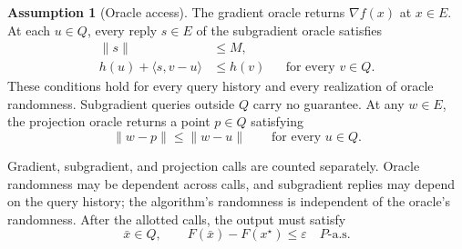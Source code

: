 \documentclass[10pt]{article}
\theoremstyle{definition}
\newtheorem{assumption}{Assumption}
\begin{document}
\begin{assumption}[Oracle access]
The gradient oracle returns $\nabla f(x)$ at $x\in E$. At each $u\in Q$, every reply $s\in E$ of the subgradient oracle satisfies
\[
\begin{aligned}
\|s\|&\leq M,\\
h(u)+\langle s,v-u\rangle&\leq h(v)
&&\text{for every }v\in Q.
\end{aligned}
\]
These conditions hold for every query history and every realization of oracle randomness. Subgradient queries outside $Q$ carry no guarantee. At any $w\in E$, the projection oracle returns a point $p\in Q$ satisfying
\[
\|w-p\|\leq\|w-u\|
\qquad\text{for every }u\in Q.
\]
\end{assumption}

Gradient, subgradient, and projection calls are counted separately. Oracle randomness may be dependent across calls, and subgradient replies may depend on the query history; the algorithm's randomness is independent of the oracle's randomness. After the allotted calls, the output must satisfy
\[
\bar{x}\in Q,
\qquad F(\bar{x})-F(x^\star)\leq\varepsilon
\quad P\text{-a.s.}
\]
\end{document}

